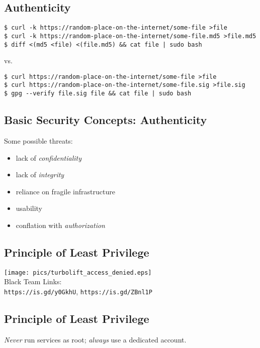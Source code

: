 \documentclass[xga]{xdvislides}
\begin{document}
\subsection{Authenticity}
\begin{verbatim}
$ curl -k https://random-place-on-the-internet/some-file >file
$ curl -k https://random-place-on-the-internet/some-file.md5 >file.md5
$ diff <(md5 <file) <(file.md5) && cat file | sudo bash 
\end{verbatim}

vs.

\begin{verbatim}
$ curl https://random-place-on-the-internet/some-file >file
$ curl https://random-place-on-the-internet/some-file.sig >file.sig
$ gpg --verify file.sig file && cat file | sudo bash
\end{verbatim}


\subsection{Basic Security Concepts: Authenticity}
Some possible threats:
\begin{itemize}
	\item lack of {\em confidentiality}
	\item lack of {\em integrity}
	\item reliance on fragile infrastructure
	\item usability
	\item conflation with {\em authorization}
\end{itemize}

\subsection{Principle of Least Privilege}
\vspace*{\fill}
\begin{center}
	\texttt{[image: pics/turbolift\_access\_denied.eps]} \\
	Black Team Links: \\
	\verb+https://is.gd/y0GkhU+, \verb+https://is.gd/ZBnl1P+
\end{center}
\vspace*{\fill}

\subsection{Principle of Least Privilege}

{\em Never} run services as root; {\em always} use a
dedicated account. \\
\end{document}
